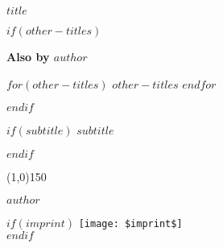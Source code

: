 \documentclass[$if(fontsize)$$fontsize$,$endif$$if(lang)$$babel-lang$,$endif$$if(papersize)$$papersize$paper,$endif$$if(beamer)$ignorenonframetext,$if(handout)$handout,$endif$$if(aspectratio)$aspectratio=$aspectratio$,$endif$$endif$$for(classoption)$$classoption$$sep$,$endfor$]{$documentclass$}
\begin{document}
  \sloppy %
  \setcounter{page}{1}

  \pagestyle{empty}
  \begin{center}
    \vspace*{\fill}

    \LARGE\textbf{\textsf{$title$}}

    \vspace*{\fill}
    \vspace*{\fill}
  \end{center}
  \clearpage

  \newpage
  \emph{ }\newline
  $if(other-titles)$
    \begin{center}
      \textbf{Also by $author$}

      $for(other-titles)$
      $other-titles$\newline
      $endfor$
    \end{center}
  $endif$
  \clearpage

  \begin{center}
    \vspace*{\fill}

    \ttfamily{\Huge\color{blue}{$title$}}

    $if(subtitle)$
    \vspace*{0.125in}
    {\centering
     \Large\textbf{\textsf{$subtitle$}}
    }


    $endif$

    \vspace*{0.25in}
    \line(1,0){150}
    \vspace*{0.25in}

    \Large\textsf{$author$}

    \vspace*{\fill}
    \vspace*{\fill}
    $if(imprint)$
    \texttt{[image: \$imprint\$]}\\[0cm]
    \vspace*{0.25in}
    $endif$
  \end{center}
  \clearpage
\end{document}
